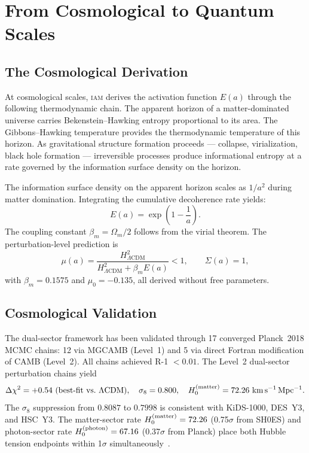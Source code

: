 \documentclass[12pt,letterpaper]{article}
\newcommand{\IAM}{\textsc{iam}}
\newcommand{\Ea}{E(a)}
\newcommand{\LCDM}{$\Lambda$CDM}
\begin{document}
\section{From Cosmological to Quantum Scales}

\subsection{The Cosmological Derivation}

At cosmological scales, \IAM{} derives the activation function $\Ea$
through the following thermodynamic chain. The apparent horizon of a
matter-dominated universe carries Bekenstein--Hawking entropy proportional
to its area. The Gibbons--Hawking temperature provides the thermodynamic
temperature of this horizon. As gravitational structure formation proceeds
--- collapse, virialization, black hole formation --- irreversible processes
produce informational entropy at a rate governed by the information surface
density on the horizon.

The information surface density on the apparent horizon scales as $1/a^2$
during matter domination. Integrating the cumulative decoherence rate yields:
\begin{equation}
    \Ea = \exp\!\left(1 - \frac{1}{a}\right).
    \label{eq:Ea}
\end{equation}
The coupling constant $\beta_m = \Omega_m/2$ follows from the virial theorem.
The perturbation-level prediction is
\begin{equation}
    \mu(a) = \frac{H^2_{\Lambda\mathrm{CDM}}}{H^2_{\Lambda\mathrm{CDM}}
    + \beta_m \Ea} < 1, \qquad \Sigma(a) = 1,
    \label{eq:sector}
\end{equation}
with $\beta_m = 0.1575$ and $\mu_0 = -0.135$, all derived without free
parameters.

\subsection{Cosmological Validation}

The dual-sector framework has been validated through 17 converged
Planck~2018 MCMC chains: 12 via MGCAMB (Level~1) and 5 via direct Fortran
modification of CAMB (Level~2). All chains achieved R-1 $< 0.01$.
The Level~2 dual-sector perturbation chains yield
\begin{equation}
    \Delta\chi^2 = +0.54~(\text{best-fit vs.\ \LCDM{}}), \quad
    \sigma_8 = 0.800, \quad
    H_0^{\rm (matter)} = 72.26~\mathrm{km\,s^{-1}\,Mpc^{-1}}.
\end{equation}
The $\sigma_8$ suppression from $0.8087$ to $0.7998$ is consistent with
KiDS-1000, DES~Y3, and HSC~Y3. The matter-sector rate $H_0^{\rm (matter)}
= 72.26$ (0.75$\sigma$ from SH0ES) and photon-sector rate
$H_0^{\rm (photon)} = 67.16$ (0.37$\sigma$ from Planck) place both
Hubble tension endpoints within 1$\sigma$ simultaneously~\citep{Mahaffey2026repo}.
\end{document}
